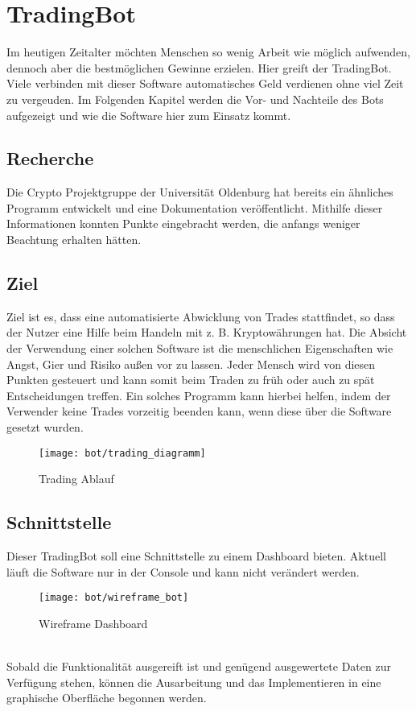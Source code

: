 
\section{TradingBot}
Im heutigen Zeitalter möchten Menschen so wenig Arbeit wie möglich aufwenden, dennoch aber die bestmöglichen Gewinne erzielen. Hier greift der TradingBot. Viele verbinden mit dieser Software automatisches Geld verdienen ohne viel Zeit zu vergeuden. Im Folgenden Kapitel werden die Vor- und Nachteile des Bots aufgezeigt und wie die Software hier zum Einsatz kommt. 

\subsection{Recherche}
Die Crypto Projektgruppe der Universität Oldenburg hat bereits ein ähnliches Programm entwickelt und eine Dokumentation veröffentlicht. Mithilfe dieser Informationen konnten Punkte eingebracht werden, die anfangs weniger Beachtung erhalten hätten.\cite{deepCrypto}

\subsection{Ziel}

Ziel ist es, dass eine automatisierte Abwicklung von Trades stattfindet, so dass der Nutzer eine Hilfe beim Handeln mit z. B. Kryptowährungen hat. Die Absicht der Verwendung einer solchen Software ist die menschlichen Eigenschaften wie Angst, Gier und Risiko außen vor zu lassen. Jeder Mensch wird von diesen Punkten gesteuert und kann somit beim Traden zu früh oder auch zu spät Entscheidungen treffen. Ein solches Programm kann hierbei helfen, indem der Verwender keine Trades vorzeitig beenden kann, wenn diese über die Software gesetzt wurden. \\[2cm]

\begin{figure}[!ht]
\texttt{[image: bot/trading\_diagramm]}
\caption{Trading Ablauf}
\label{Trading_Diagramm}
\end{figure}

\subsection{Schnittstelle}
Dieser TradingBot soll eine Schnittstelle zu einem Dashboard bieten. Aktuell läuft die Software nur in der Console und kann nicht verändert werden.
\begin{figure}[!ht]
\texttt{[image: bot/wireframe\_bot]}
\caption{Wireframe Dashboard}
\label{Wireframe_Dashboard}
\end{figure}
\\
Sobald die Funktionalität ausgereift ist und genügend ausgewertete Daten zur Verfügung stehen, können die Ausarbeitung und das Implementieren in eine graphische Oberfläche begonnen werden.

